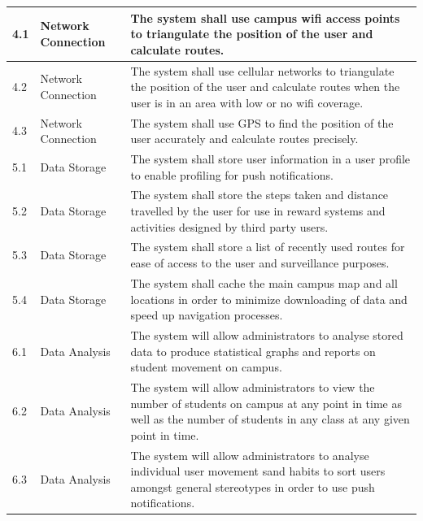 \documentclass[12pt]{article}
\begin{document}
\begin{longtable}{|p{}| p{} | p{} |}
\hline

4.1& Network Connection & The system shall use campus wifi access points to triangulate the position of the user and calculate routes.  \\

\hline

4.2& Network Connection & The system shall use cellular networks to triangulate the position of the user and calculate routes when the user is in an area with low or no wifi coverage.\\

\hline

4.3& Network Connection & The system shall use GPS to find the position of the user accurately and calculate routes precisely.\\
\hline

5.1& Data Storage & The system shall store user information in a user profile to enable profiling for push notifications.\\

\hline

5.2& Data Storage & The system shall store the steps taken and distance travelled by the user for use in reward systems and activities designed by third party users.\\

\hline

5.3& Data Storage & The system shall store a list of recently used routes for ease of access to the user and surveillance purposes.\\

\hline

5.4& Data Storage & The system shall cache the main campus map and all locations in order to minimize downloading of data and speed up navigation processes.\\

\hline

6.1& Data Analysis & The system will allow administrators to analyse stored data to produce statistical graphs and reports on student movement on campus.\\

\hline

6.2& Data Analysis & The system will allow administrators to view the number of students on campus at any point in time as well as the number of students in any class at any given point in time.\\

\hline

6.3& Data Analysis & The system will allow administrators to analyse individual user movement sand habits to sort users amongst general stereotypes in order to use push notifications.\\


\end{longtable}
\end{document}
